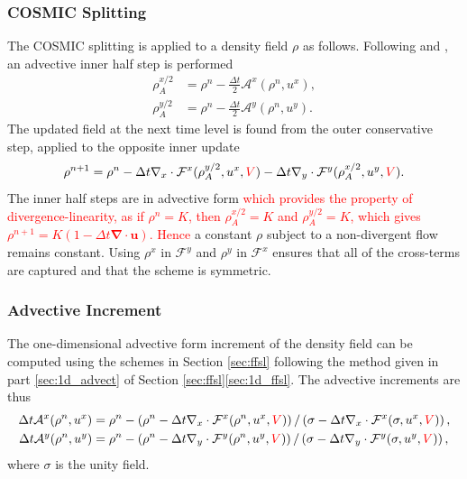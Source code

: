 \documentclass{ametsocV6.1}
\newcommand{\change}[1]{\textcolor{red}{#1}}
\begin{document}
\subsubsection{COSMIC Splitting} \label{sec:cosmic_density}
The COSMIC splitting is applied to a density field $\rho$ as follows.
Following \citet{leonard1996cosmic} and \citet{lin1996ffsl}, an advective inner half step is performed
\begin{subequations}
\begin{align}
    \rho_A^{x/2} &= \rho^n - \frac{\Delta{t}}{2} \mathcal{A}^x(\rho^n, u^x), \\
    \rho_A^{y/2} &= \rho^n - \frac{\Delta{t}}{2} \mathcal{A}^y(\rho^n, u^y).
\end{align}
\end{subequations}
The updated field at the next time level is found from the outer conservative step, applied to the opposite inner update
\begin{equation} \label{eqn:cosmic_density}
    \rho^{n+1} = \rho^{n} - \Delta{t} \nabla_x\cdot \mathcal{F}^x(\rho_A^{y/2},u^x,\change{V}) - \Delta{t} \nabla_y \cdot \mathcal{F}^y(\rho_A^{x/2},u^y,\change{V}).
\end{equation}
The inner half steps are in advective form \change{which provides the property of divergence-linearity, as if $\rho^n=K$, then $\rho_A^{x/2}=K$ and $\rho_A^{y/2}=K$, which gives $\rho^{n+1}=K(1-\Delta t\bm{\nabla\cdot u})$.}
\change{Hence} a constant $\rho$ subject to a non-divergent flow remains constant. Using $\rho^x$ in $\mathcal{F}^y$ and $\rho^y$ in $\mathcal{F}^x$ ensures that all of the cross-terms are captured \citep{kent2019crossterms} and that the scheme is symmetric. 

\subsubsection{Advective Increment} \label{sec:advective_increment}

The one-dimensional advective form increment of the density field can be computed using the schemes in Section \ref{sec:ffsl} following the method given in part \ref{sec:1d_advect} of Section \ref{sec:ffsl}\ref{sec:1d_ffsl}. The advective increments are thus
\begin{subequations} \label{eqn:advective_operators}
\begin{align}
    \Delta{t} \mathcal{A}^x(\rho^n, u^x) &= \rho^n - \left( \rho^n - \Delta{t} \nabla_x\cdot \mathcal{F}^x(\rho^n,u^x,\change{V})\right)/\left( \sigma - \Delta{t} \nabla_x\cdot \mathcal{F}^x(\sigma,u^x,\change{V})\right), \\
    \Delta{t} \mathcal{A}^y(\rho^n, u^y) &= \rho^n - \left( \rho^n - \Delta{t} \nabla_y\cdot \mathcal{F}^y(\rho^n,u^y,\change{V})\right)/\left( \sigma - \Delta{t} \nabla_y\cdot \mathcal{F}^y(\sigma,u^y,\change{V})\right),
\end{align}
\end{subequations}
where $\sigma$ is the unity field.
\end{document}

